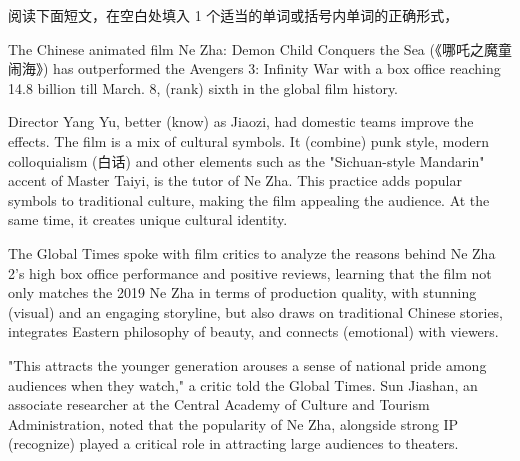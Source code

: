 \documentclass{英语试卷}
\begin{document}
\par 阅读下面短文，在空白处填入 1 个适当的单词或括号内单词的正确形式，\par
\par The Chinese animated film Ne Zha: Demon Child Conquers the Sea (《哪吒之魔童闹海》) has outperformed the Avengers 3: Infinity War with a box office reaching 14.8 billion till March. 8,  (rank) sixth in the global film history.\par
\par Director Yang Yu, better  (know) as Jiaozi, had domestic teams improve the effects. The film is a mix of cultural symbols. It  (combine) punk style, modern colloquialism (白话) and other elements such as the "Sichuan-style Mandarin" accent of Master Taiyi,  is the tutor of Ne Zha. This practice adds popular symbols to traditional culture, making the film appealing  the audience. At the same time, it creates  unique cultural identity.\par
\par The Global Times spoke with film critics to analyze the reasons behind Ne Zha 2's high box office performance and positive reviews, learning that the film not only matches the 2019 Ne Zha in terms of production quality, with stunning  (visual) and an engaging storyline, but also draws on traditional Chinese stories, integrates Eastern philosophy of beauty, and connects  (emotional) with viewers.\par
\par "This attracts the younger generation  arouses a sense of national pride among audiences when they watch," a critic told the Global Times. Sun Jiashan, an associate researcher at the Central Academy of Culture and Tourism Administration, noted that the popularity of Ne Zha, alongside strong IP  (recognize) played a critical role in attracting large audiences to theaters.\par
\end{document}
